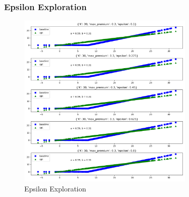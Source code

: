 \documentclass[11pt]{article}
\begin{document}
        \subsubsection*{Epsilon Exploration}
            \begin{figure}[H]
                \centering
                \caption{Epsilon Exploration}
                \includegraphics[width=0.75\textwidth]{../../output/figures/CVaR3/epsilon_exploration.png}
            \end{figure}


            \FloatBarrier









\end{document}

